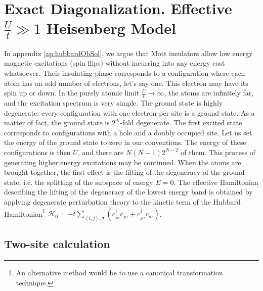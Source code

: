 \section{Exact Diagonalization. Effective $\frac{U}{t} \gg 1$ Heisenberg Model}\label{sec:effectiveHeisenberg}

In appendix \ref{ap:hubbardObSol}, we argue that Mott insulators allow low energy magnetic excitations (spin flips) without incurring into any energy cost whatsoever.
Their insulating phase corresponds to a configuration where each atom has an odd number of electrons, let's say one.
This electron may have its spin up or down.
In the purely atomic limit $\frac{U}{t} \rightarrow \infty$, the atoms are infinitely far, and the excitation spectrum is very simple.
The ground state is highly degenerate: every configuration with one electron per site is a ground state.
As a matter of fact, the ground state is $2^N$-fold degenerate.
The first excited state corresponds to configurations with a hole and a doubly occupied site.
Let us set the energy of the ground state to zero in our conventions.
The energy of these configurations is then $U$, and there are $N(N-1)2^{N-2}$ of them.
This process of generating higher energy excitations may be continued.
When the atoms are brought together, the first effect is the lifting of the degeneracy of the ground state, i.e. the splitting of the subspace of energy $E = 0$.
The effective Hamiltonian describing the lifting of the degeneracy of the lowest energy band is obtained by applying degenerate perturbation theory \cite{mila_physique_2007} to the kinetic term of the Hubbard Hamiltonian\footnote{An alternative method would be to use a canonical transformation technique.}
$
\mathcal{H}_0 = - t \sum_{\left\langle i, j \right\rangle, \sigma} ( c_{i\sigma}^\dagger c_{j\sigma} + c_{j\sigma}^\dagger c_{i\sigma} ) 
$.

\subsection{Two-site calculation}

